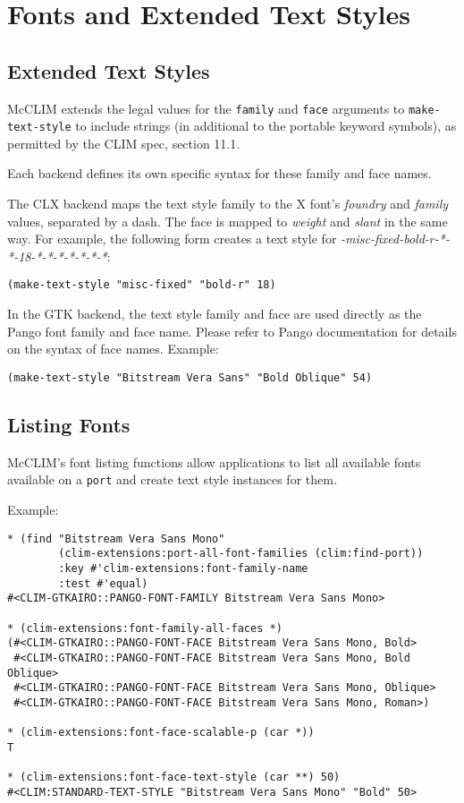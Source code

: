 \chapter{Fonts and Extended Text Styles}

\section{Extended Text Styles}

McCLIM extends the legal values for the \texttt{family} and \texttt{face}
arguments to \texttt{make-text-style} to include strings (in additional to
the portable keyword symbols), as permitted by the CLIM spec, section
11.1.

Each backend defines its own specific syntax for these family and face
names.

The CLX backend maps the text style family to the X font's
\emph{foundry} and \emph{family} values, separated by a dash.  The
face is mapped to \emph{weight} and \emph{slant} in the same way.  For
example, the following form creates a text style for
\emph{-misc-fixed-bold-r-*-*-18-*-*-*-*-*-*-*}:

\begin{verbatim}
(make-text-style "misc-fixed" "bold-r" 18)
\end{verbatim}

In the GTK backend, the text style family and face are used directly
as the Pango font family and face name.  Please refer to Pango
documentation for details on the syntax of face names.  Example:

\begin{verbatim}
(make-text-style "Bitstream Vera Sans" "Bold Oblique" 54)
\end{verbatim}

\section{Listing Fonts}

McCLIM's font listing functions allow applications to list all
available fonts available on a \texttt{port} and create text style
instances for them.

Example:

\begin{verbatim}
* (find "Bitstream Vera Sans Mono"
        (clim-extensions:port-all-font-families (clim:find-port))
        :key #'clim-extensions:font-family-name
        :test #'equal)
#<CLIM-GTKAIRO::PANGO-FONT-FAMILY Bitstream Vera Sans Mono>

* (clim-extensions:font-family-all-faces *)
(#<CLIM-GTKAIRO::PANGO-FONT-FACE Bitstream Vera Sans Mono, Bold>
 #<CLIM-GTKAIRO::PANGO-FONT-FACE Bitstream Vera Sans Mono, Bold Oblique>
 #<CLIM-GTKAIRO::PANGO-FONT-FACE Bitstream Vera Sans Mono, Oblique>
 #<CLIM-GTKAIRO::PANGO-FONT-FACE Bitstream Vera Sans Mono, Roman>)

* (clim-extensions:font-face-scalable-p (car *))
T

* (clim-extensions:font-face-text-style (car **) 50)
#<CLIM:STANDARD-TEXT-STYLE "Bitstream Vera Sans Mono" "Bold" 50>
\end{verbatim}

